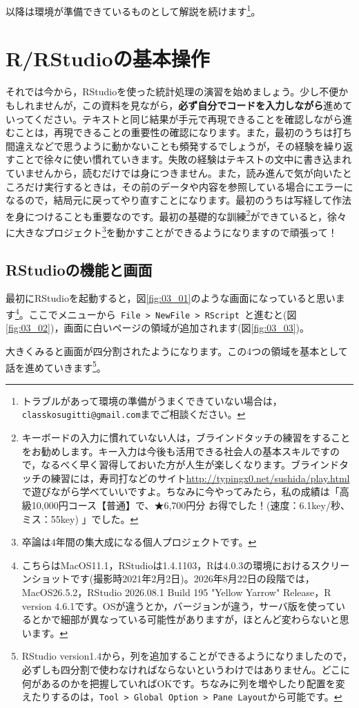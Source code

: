 \documentclass{ltjsbook}
\begin{document}
以降は環境が準備できているものとして解説を続けます\footnote{トラブルがあって環境の準備がうまくできていない場合は，\texttt{classkosugitti@gmail.com}までご相談ください。}。

\section{R/RStudioの基本操作}
それでは今から，RStudioを使った統計処理の演習を始めましょう。少し不便かもしれませんが，この資料を見ながら，\textbf{必ず自分でコードを入力しながら}進めていってください。テキストと同じ結果が手元で再現できることを確認しながら進むことは，再現できることの重要性の確認になります。また，最初のうちは打ち間違えなどで思うように動かないことも頻発するでしょうが，その経験を繰り返すことで徐々に使い慣れていきます。失敗の経験はテキストの文中に書き込まれていませんから，読むだけでは身につきません。また，読み進んで気が向いたところだけ実行するときは，その前のデータや内容を参照している場合にエラーになるので，結局元に戻ってやり直すことになります。最初のうちは写経して作法を身につけることも重要なのです。最初の基礎的な訓練\footnote{キーボードの入力に慣れていない人は，ブラインドタッチの練習をすることをお勧めします。キー入力は今後も活用できる社会人の基本スキルですので，なるべく早く習得しておいた方が人生が楽しくなります。ブラインドタッチの練習には，寿司打などのサイト\url{http://typingx0.net/sushida/play.html}で遊びながら学べていいですよ。ちなみに今やってみたら，私の成績は「高級10,000円コース【普通】で、★6,700円分 お得でした！(速度：6.1key/秒、ミス：55key) 」でした。}ができていると，徐々に大きなプロジェクト\footnote{卒論は4年間の集大成になる個人プロジェクトです。}を動かすことができるようになりますので頑張って！

\subsection{RStudioの機能と画面}
最初にRStudioを起動すると，図\ref{fig:03_01}のような画面になっていると思います\footnote{こちらはMacOS11.1，RStudioは1.4.1103，Rは4.0.3の環境におけるスクリーンショットです(撮影時2021年2月2日)。2026年8月22日の段階では，MacOS26.5.2，RStudio 2026.08.1 Build 195 "Yellow Yarrow" Release，R version 4.6.1です。OSが違うとか，バージョンが違う，サーバ版を使っているとかで細部が異なっている可能性がありますが，ほとんど変わらないと思います。}。ここでメニューから\verb| File > NewFile > RScript |と進むと(図\ref{fig:03_02})，画面に白いページの領域が追加されます(図\ref{fig:03_03})。

大きくみると画面が四分割されたようになります。この4つの領域を基本として話を進めていきます\footnote{RStudio version1.4から，列を追加することができるようになりましたので，必ずしも四分割で使わなければならないというわけではありません。どこに何があるのかを把握していればOKです。ちなみに列を増やしたり配置を変えたりするのは，\verb|Tool > Global Option > Pane Layout|から可能です。}。
\end{document}
